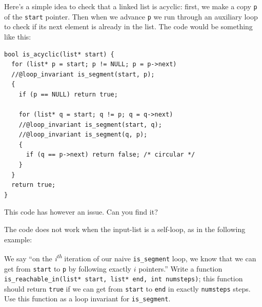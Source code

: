 \begin{flex}
\begin{exercise}
\label{ex:linked-list_bad-is_acyclic}
  Here's a simple idea to check that a linked list is acyclic: first,
  we make a copy \lstinline'p' of the \lstinline'start' pointer.  Then
  when we advance \lstinline'p' we run through an auxiliary loop to
  check if its next element is already in the list.  The code would be
  something like this:
\begin{lstlisting}[language={[C0]C}]
bool is_acyclic(list* start) {
  for (list* p = start; p != NULL; p = p->next)
  //@loop_invariant is_segment(start, p);
  {
    if (p == NULL) return true;

    for (list* q = start; q != p; q = q->next)
    //@loop_invariant is_segment(start, q);
    //@loop_invariant is_segment(q, p);
    {
      if (q == p->next) return false; /* circular */
    }
  }
  return true;
}
\end{lstlisting}
  This code has however an issue.  Can you find it?
\end{exercise}


\begin{solution}
\label{ex:linked-list_bad-is_acyclic-solved}
The code does not work when the input-list is a self-loop, as in the
following example:
\par\medskip\noindent\usebox{\lstbox}\par
\end{solution}
\end{flex}


\begin{exercise}
We say ``on the \emph{i\textsuperscript{th}} iteration of our naive
\lstinline'is_segment' loop, we know that we can get from \lstinline'start' to
\lstinline'p' by following exactly $i$ pointers.'' Write a function
\lstinline'is_reachable_in(list* start, list* end, int numsteps)'; this
function should
return \lstinline'true' if we can get from \lstinline'start' to \lstinline'end' in
exactly \lstinline'numsteps' steps. Use this function as a loop invariant for
\lstinline'is_segment'.
\end{exercise}

